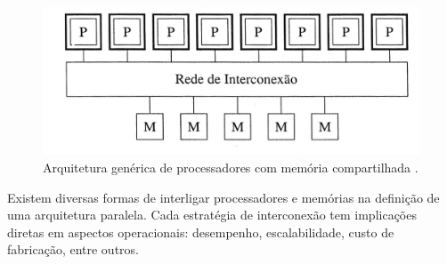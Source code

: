 \documentclass[ccc, pg2]{esinucpel}
\begin{document}
\begin{figure}[htbp]
\centering
\includegraphics[scale=1]{images/smp1.jpg}
\caption{Arquitetura genérica de processadores com memória compartilhada \cite{bib:crad}.}
\label{fig:smp}
\end{figure}

Existem diversas formas de interligar processadores e memórias na definição de uma arquitetura paralela. Cada estratégia de interconexão tem implicações diretas em aspectos operacionais: desempenho, escalabilidade, custo de fabricação, entre outros. %



\end{document}
